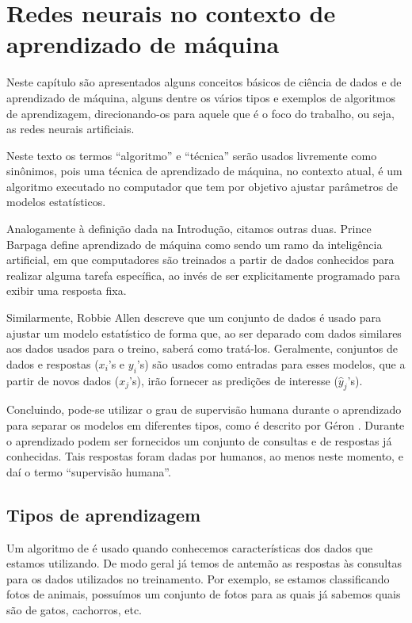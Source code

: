 
\chapter{Redes neurais no contexto de aprendizado de máquina}
\label{cap:redes}

Neste capítulo são apresentados alguns conceitos básicos de ciência de dados e de aprendizado de máquina, alguns dentre os vários tipos e exemplos de algoritmos de aprendizagem, direcionando-os para aquele que é o foco do trabalho, ou seja, as redes neurais artificiais.

Neste texto os termos ``algoritmo'' e ``técnica'' serão usados livremente como sinônimos, pois uma técnica de aprendizado de máquina, no contexto atual, é um algoritmo executado no computador que tem por objetivo ajustar parâmetros de modelos estatísticos.

Analogamente à definição dada na Introdução, citamos outras duas. Prince Barpaga \citep{prince} define aprendizado de máquina como sendo um ramo da inteligência artificial, em que computadores são treinados a partir de dados conhecidos para realizar alguma tarefa específica, ao invés de ser explicitamente programado para exibir uma resposta fixa.

Similarmente, Robbie Allen \citep{allen} descreve que um conjunto de dados é usado para ajustar um modelo estatístico de forma que, ao ser deparado com dados similares aos dados usados para o treino, saberá como tratá-los. Geralmente, conjuntos de dados e respostas ($x_i$'s e $y_i$'s) são usados como entradas para esses modelos, que a partir de novos dados ($x_j$'s), irão fornecer as predições de interesse ($\hat{y}_j$'s).

Concluindo, pode-se utilizar o grau de supervisão humana durante o aprendizado para separar os modelos em diferentes tipos, como é descrito por Géron \citep{hands}. Durante o aprendizado podem ser fornecidos um conjunto de consultas e de respostas já conhecidas. Tais respostas foram dadas por humanos, ao menos neste momento, e daí o termo ``supervisão humana''.

\section{Tipos de aprendizagem}

Um algoritmo de  é usado quando conhecemos características dos dados que estamos utilizando. De modo geral já temos de antemão as respostas às consultas para os dados utilizados no treinamento. Por exemplo, se estamos classificando fotos de animais, possuímos um conjunto de fotos para as quais já sabemos quais são de gatos, cachorros, etc.


